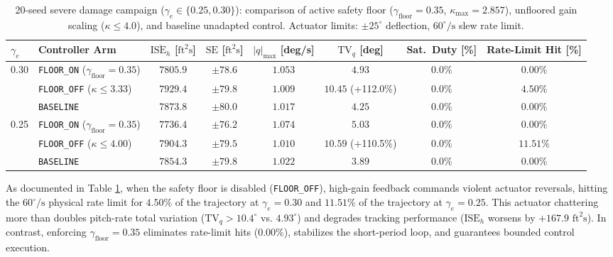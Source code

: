 \documentclass[review,12pt]{elsarticle}
\begin{document}
\begin{table}[!htbp]
\centering
\caption{20-seed severe damage campaign ($\gamma_e \in \{0.25, 0.30\}$): comparison of active safety floor ($\gamma_{\text{floor}} = 0.35$, $\kappa_{\max} = 2.857$), unfloored gain scaling ($\kappa \le 4.0$), and baseline unadapted control. Actuator limits: $\pm 25^\circ$ deflection, $60^\circ/\text{s}$ slew rate limit.}
\label{tab:severe_regime}
\scriptsize
\setlength{\tabcolsep}{3pt}
\begin{adjustbox}{max width=\textwidth}
\begin{tabular}{llcccccc}
\toprule
$\gamma_e$ & Controller Arm & $\overline{\text{ISE}_h}$ [$\text{ft}^2\text{s}$] & $\text{SE}$ [$\text{ft}^2\text{s}$] & $|q|_{\max}$ [deg/s] & $\text{TV}_q$ [deg] & Sat.\ Duty [\%] & Rate-Limit Hit [\%] \\
\midrule
\multirow{3}{*}{0.30} & \texttt{FLOOR\_ON} ($\gamma_{\text{floor}}=0.35$) & $\bm{7805.9}$ & $\pm 78.6$ & $1.053$ & $\bm{4.93}$ & $0.0\%$ & $\bm{0.00\%}$ \\
 & \texttt{FLOOR\_OFF} ($\kappa \le 3.33$) & $7929.4$ & $\pm 79.8$ & $1.009$ & $10.45$ (+112.0\%) & $0.0\%$ & $\bm{4.50\%}$ \\
 & \texttt{BASELINE} & $7873.8$ & $\pm 80.0$ & $1.017$ & $4.25$ & $0.0\%$ & $0.00\%$ \\
\midrule
\multirow{3}{*}{0.25} & \texttt{FLOOR\_ON} ($\gamma_{\text{floor}}=0.35$) & $\bm{7736.4}$ & $\pm 76.2$ & $1.074$ & $\bm{5.03}$ & $0.0\%$ & $\bm{0.00\%}$ \\
 & \texttt{FLOOR\_OFF} ($\kappa \le 4.00$) & $7904.3$ & $\pm 79.5$ & $1.010$ & $10.59$ (+110.5\%) & $0.0\%$ & $\bm{11.51\%}$ \\
 & \texttt{BASELINE} & $7854.3$ & $\pm 79.8$ & $1.022$ & $3.89$ & $0.0\%$ & $0.00\%$ \\
\bottomrule
\end{tabular}
\end{adjustbox}
\end{table}

As documented in Table \ref{tab:severe_regime}, when the safety floor is disabled (\texttt{FLOOR\_OFF}), high-gain feedback commands violent actuator reversals, hitting the $60^\circ/\text{s}$ physical rate limit for $\bm{4.50\%}$ of the trajectory at $\gamma_e = 0.30$ and $\bm{11.51\%}$ of the trajectory at $\gamma_e = 0.25$. This actuator chattering more than doubles pitch-rate total variation ($\text{TV}_q > 10.4^\circ$ vs. $4.93^\circ$) and degrades tracking performance ($\text{ISE}_h$ worsens by $+167.9\text{ ft}^2\text{s}$). In contrast, enforcing $\gamma_{\text{floor}} = 0.35$ eliminates rate-limit hits ($0.00\%$), stabilizes the short-period loop, and guarantees bounded control execution.
\end{document}
